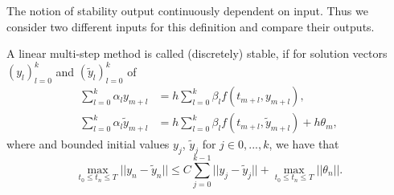 	
	The notion of stability output continuously dependent on input. Thus we consider two different inputs for this definition and compare their outputs.
	
	\newpage
	
	\begin{definition} \label{discrete stability LMSM}
		A linear multi-step method is called (discretely) stable, if for solution vectors $(y_l)_{l=0}^k$ and $(\tilde{y}_l)_{l=0}^k$ of
		\begin{align}
			\sum_{l=0}^{k} \alpha_l y_{m+l} &= h \sum_{l=0}^{k} \beta_l f(t_{m+l}, y_{m+l}), \\
			\sum_{l=0}^{k} \alpha_l \tilde{y}_{m+l} &= h \sum_{l=0}^{k} \beta_l f(t_{m+l}, \tilde{y}_{m+l}) + h\theta_m,
		\end{align} 
		where and bounded initial values $y_j$, $\tilde{y}_j$ for $j \in {0,...,k}$, we have that
		\begin{displaymath}
			\max_{t_0 \leq t_n \leq T} ||y_n - \tilde{y}_n|| \leq C \sum_{j=0}^{k-1} ||y_j - \tilde{y}_j|| + \max_{t_0 \leq t_n \leq T} ||\theta_n||.
		\end{displaymath}
	\end{definition}
	
	
	
	
